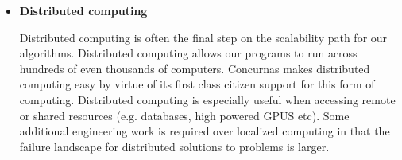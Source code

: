 \documentclass[conc-doc]{subfiles}
\begin{document}
\begin{itemize}
	\item \textbf{Distributed computing}
	
		Distributed computing is often the final step on the scalability path for our algorithms. Distributed computing allows our programs to run across hundreds of even thousands of computers. Concurnas makes distributed computing easy by virtue of its first class citizen support for this form of computing. Distributed computing is especially useful when accessing remote or shared resources (e.g. databases, high powered GPUS etc). Some additional engineering work is required over localized computing in that the failure landscape for distributed solutions to problems is larger.
		
\end{itemize}
\end{document}
